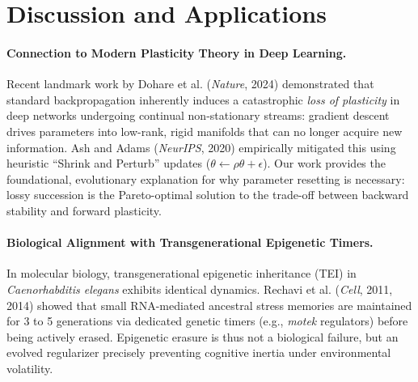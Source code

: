 \documentclass[11pt,a4paper]{article}
\begin{document}
\begin{table}[h]
\centering
\caption{Permuted-MNIST Continual Learning Benchmark Comparison}
\label{tab:permuted_mnist_bench}
\vspace{0.2cm}
\end{table}

\section{Discussion and Applications}
\paragraph{Connection to Modern Plasticity Theory in Deep Learning.}
Recent landmark work by Dohare et al. (\textit{Nature}, 2024) demonstrated that standard backpropagation inherently induces a catastrophic \textit{loss of plasticity} in deep networks undergoing continual non-stationary streams: gradient descent drives parameters into low-rank, rigid manifolds that can no longer acquire new information. Ash and Adams (\textit{NeurIPS}, 2020) empirically mitigated this using heuristic ``Shrink and Perturb'' updates ($\theta \leftarrow \rho \theta + \epsilon$). Our work provides the foundational, evolutionary explanation for why parameter resetting is necessary: lossy succession is the Pareto-optimal solution to the trade-off between backward stability and forward plasticity.

\paragraph{Biological Alignment with Transgenerational Epigenetic Timers.}
In molecular biology, transgenerational epigenetic inheritance (TEI) in \textit{Caenorhabditis elegans} exhibits identical dynamics. Rechavi et al. (\textit{Cell}, 2011, 2014) showed that small RNA-mediated ancestral stress memories are maintained for 3 to 5 generations via dedicated genetic timers (e.g., \textit{motek} regulators) before being actively erased. Epigenetic erasure is thus not a biological failure, but an evolved regularizer precisely preventing cognitive inertia under environmental volatility.
\end{document}
